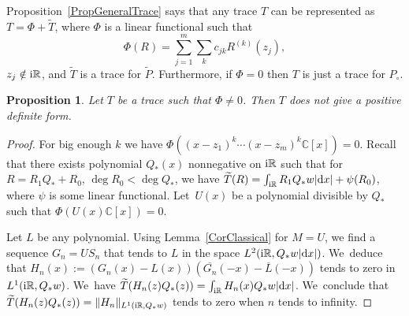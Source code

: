 \documentclass[pdftex]{sigma}
\newcommand{\RN}{\mathbb{R}} %
\newcommand{\CN}{\mathbb{C}} %
\newcommand{\ovl}{\overline}
\newtheorem{Proposition}[Theorem]{Proposition}
\theoremstyle{definition}
\numberwithin{equation}{section}
\begin{document}
Proposition~\ref{PropGeneralTrace} says that any trace $T$ can be represented as $T=\Phi+\widetilde{T}$, where $\Phi$ is a linear functional such that
\[
\Phi(R)=\sum_{j=1}^m\sum_k c_{jk} R^{(k)}(z_j),
\]
 $z_j\notin {\rm i}\RN$, and $\widetilde{T}$ is a trace for $\widetilde{P}$. Furthermore, if $\Phi=0$ then $T$ is just a trace for $P_\circ$.

\begin{Proposition}
\label{PropPositivePhiIsZero}
Let $T$ be a trace such that $\Phi\neq 0$. Then $T$ does not give a positive definite form.
\end{Proposition}
\begin{proof}
For big enough $k$ we have $\Phi((x-z_1)^k\cdots (x-z_m)^k \CN[x])=0$. Recall that there exists polynomial $Q_*(x)$ nonnegative on ${\rm i}\RN$ such that for $R=R_1Q_*+R_0$, $\deg R_0<\deg Q_*$, we have $\widetilde{T}(R)=\int_{{\rm i}\RN} R_1Q_* w |{\rm d}x|+\psi(R_0)$, where $\psi$ is some linear functional. Let~$U(x)$ be a polynomial divisible by $Q_*$ such that $\Phi(U(x)\CN[x])=0$.

Let $L$ be any polynomial. Using Lemma~\ref{CorClassical} for $M=U$, we find a sequence $G_n=US_n$ that tends to $L$ in the space $L^2({\rm i}\RN, Q_*w|{\rm d}x|)$. We~deduce that $H_n(x):=(G_n(x)-L(x))(\ovl{G_n}(-x)-\ovl{L}(-x))$ tends to zero in $L^1({\rm i}\RN,Q_*w)$. We~have $\widetilde{T}(H_n(z)Q_*(z))=\int_{{\rm i}\RN}H_n(x) Q_* w|{\rm d}x|$. We~conclude that $\widetilde{T}(H_n(z)Q_*(z))=\|H_n\|_{L^1({\rm i}\RN,Q_*w)}$ tends to zero when $n$ tends to infinity.


\end{proof}
\end{document}
